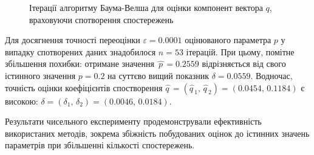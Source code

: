 \begin{figure}[H]\centering
    \setfontsize{14pt}
    \caption{Ітерації алгоритму Баума-Велша для оцінки компонент вектора $q$, враховуючи спотворення спостережень}
    \label{pic: q distortion baum-welch learning algorithm}
\end{figure}

\newpage
Для досягнення точності переоцінки $\varepsilon=0.0001$ оцінюваного параметра $p$ у випадку спотворених даних знадобилося $n=53$ ітерацій. При цьому, помітне збільшення похибки: отримане значення $\widehat{\,p\,}=0.2559$ відрізняється від свого істинного значення $p=0.2$ на суттєво вищий показник $\delta=0.0559$. Водночас, точність оцінки коефіцієнтів спостворення $\widehat{q\,} = \left( \widehat{q\,}_1,\,\widehat{q\,}_2 \right) = (0.0454,\,0.1184)$ є високою: $\delta=(\delta_1,\,\delta_2)=(0.0046,\,0.0184)$.

\chapconclude{\ref{chap: practice}}

Результати чисельного експерименту продемонстрували ефективність використаних методів, зокрема збіжність побудованих оцінок до істинних значень параметрів при збільшенні кількості спостережень.